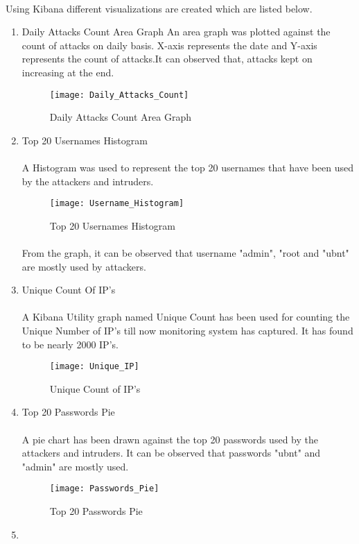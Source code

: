 \documentclass{article}
\begin{document}
\paragraph{}
Using Kibana different visualizations are created which are listed below.
\begin{enumerate}
\item Daily Attacks Count Area Graph
An area graph was plotted against the count of attacks on daily basis. X-axis represents the date and Y-axis represents the count of attacks.It can observed that, attacks kept on increasing at the end.

\begin{figure}[H]
\centering
\caption{Daily Attacks Count Area Graph}
\texttt{[image: Daily\_Attacks\_Count]}
\end{figure}


\item Top 20 Usernames Histogram
\paragraph{}
A Histogram was used to represent the top 20 usernames that have been used by the attackers and intruders.

\begin{figure}[H]
\centering
\caption{Top 20 Usernames Histogram}
\texttt{[image: Username\_Histogram]}
\end{figure}

\paragraph{}
From the graph, it can be observed that username "admin", "root and "ubnt" are mostly used by attackers.

\item Unique Count Of IP's
\paragraph{}
A Kibana Utility graph named Unique Count has been used for counting the Unique Number of IP's till now monitoring system has captured. It has found to be nearly 2000 IP's.

\begin{figure}[H]
\centering
\caption{Unique Count of IP's}
\texttt{[image: Unique\_IP]}
\end{figure}

\item Top 20 Passwords Pie
\paragraph{}
A pie chart has been drawn against the top 20 passwords used by the attackers and intruders. It can be observed that passwords "ubnt" and "admin" are mostly used.

\begin{figure}[H]
\centering
\caption{Top 20 Passwords Pie}
\texttt{[image: Passwords\_Pie]}
\end{figure}

\item 
\end{enumerate}
\end{document}
